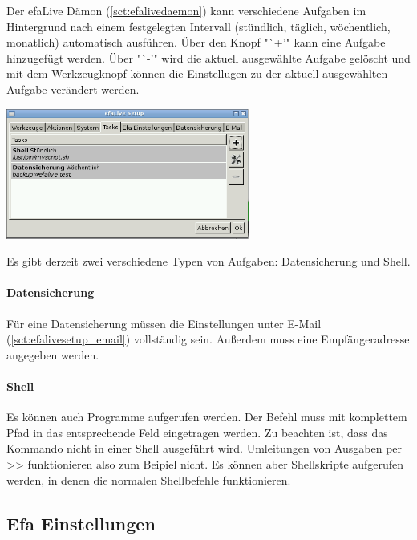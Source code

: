 \documentclass[a4paper,12pt,twoside]{article}
\begin{document}
Der efaLive Dämon (\ref{sct:efalivedaemon}) kann verschiedene Aufgaben im
Hintergrund nach einem festgelegten Intervall (stündlich, täglich, 
wöchentlich, monatlich) automatisch ausführen. Über den
Knopf "`+'" kann eine Aufgabe hinzugefügt werden. Über "`-'" wird die aktuell 
ausgewählte Aufgabe gelöscht und mit dem Werkzeugknopf können die Einstellugen
zu der aktuell ausgewählten Aufgabe verändert werden.

\bigskip
\begin{minipage}{\linewidth}
    \centering
    \captionsetup{type=figure}
    \includegraphics[width=8cm]{screenshots/efalive_setup_tasks.png}
    \label{fig:efalivesetup_tasks}
\end{minipage}
\bigskip

Es gibt derzeit zwei verschiedene Typen von Aufgaben: Datensicherung und Shell.

\paragraph{Datensicherung}
Für eine Datensicherung müssen die Einstellungen unter E-Mail (\ref{sct:efalivesetup_email})
vollständig sein. Außerdem muss eine Empfängeradresse angegeben werden.

\paragraph{Shell}
Es können auch Programme aufgerufen werden. Der Befehl muss mit komplettem Pfad in 
das entsprechende Feld eingetragen werden. Zu beachten ist, dass das Kommando nicht 
in einer Shell ausgeführt wird. Umleitungen von Ausgaben per >> funktionieren also
zum Beipiel nicht. Es können aber Shellskripte aufgerufen werden, in denen 
die normalen Shellbefehle funktionieren.


\subsection{Efa Einstellungen}
\label{sct:efalivesetup_efa_settings}
\end{document}
